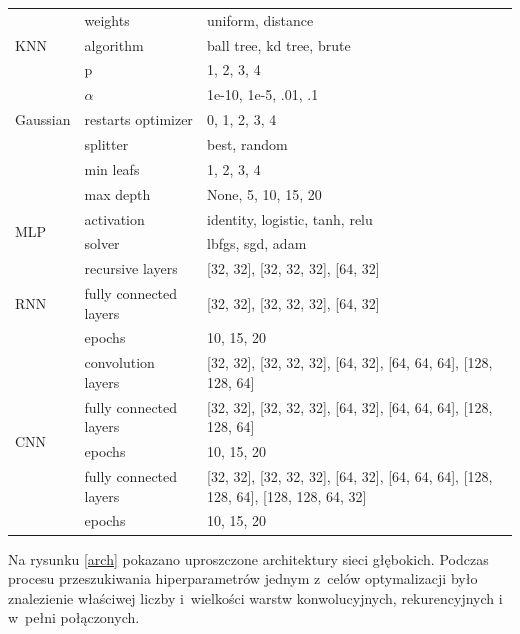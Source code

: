 \begin{table}[H]
    \centering
    \bigskip
    \begin{tabular}{|m{4cm}|m{4cm}|m{4cm}|}
    \hline
    \multirow{3}{*}{KNN} & weights & uniform, distance\\
    \cline{2-3}
     & algorithm & ball tree, kd tree, brute\\
    \cline{2-3}
        & p & 1, 2, 3, 4\\
    \hline
    \multirow{3}{*}{Gaussian} & $\alpha$ & 1e-10, 1e-5, .01, .1 \\
    \cline{2-3}
    & restarts optimizer & 0, 1, 2, 3, 4\\
    \hline
    \multirow{3}{*}{Drzewo decyzyjne} & splitter & best, random \\
    \cline{2-3}
     & min leafs & 1, 2, 3, 4\\
    \cline{2-3}
     & max depth & None, 5, 10, 15, 20\\
    \hline
    \multirow{2}{*}{MLP} & activation & identity, logistic, tanh, relu \\
    \cline{2-3}
     & solver & lbfgs, sgd, adam\\
    \hline
    \multirow{3}{*}{RNN} & recursive layers & [32, 32], [32, 32, 32], [64, 32] \\
    \cline{2-3}
     & fully connected layers & [32, 32], [32, 32, 32], [64, 32]\\
    \cline{2-3}
     & epochs & 10, 15, 20\\
    \hline
    \multirow{5}{*}{CNN} & convolution layers &                                   [32, 32],
    [32, 32, 32],
    [64, 32],
    [64, 64, 64],
    [128, 128, 64] \\
    \cline{2-3}
     & fully connected layers & 
     [32, 32],
     [32, 32, 32],
     [64, 32],
     [64, 64, 64],
     [128, 128, 64]\\
    \cline{2-3}
     & epochs & 10, 15, 20\\
    \hline
    \multirow{2}{*}{NN} & fully connected layers &                                   [32, 32],
    [32, 32, 32],
    [64, 32],
    [64, 64, 64],
    [128, 128, 64],
    [128, 128, 64, 32]\\
    \cline{2-3}
     & epochs & 10, 15, 20 \\
    \hline

    \end{tabular}
\end{table}

Na rysunku \ref{arch} pokazano uproszczone architektury sieci głębokich.
Podczas procesu przeszukiwania hiperparametrów jednym z~celów optymalizacji 
było znalezienie właściwej liczby i~wielkości warstw konwolucyjnych, rekurencyjnych
i w~pełni połączonych.


